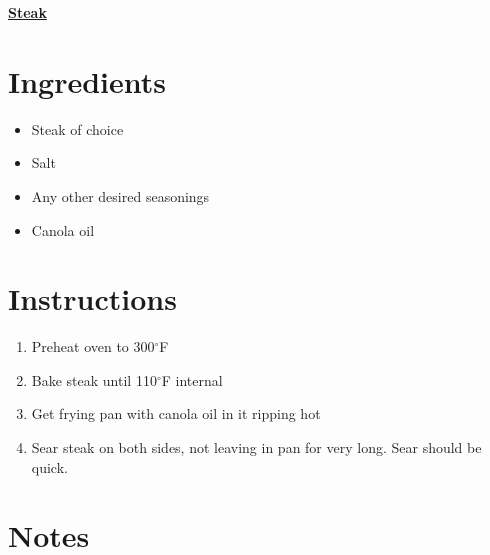 \documentclass[11pt]{article}
\begin{document}
	\begin{center}\begin{huge}\underline{\textbf{Steak}}\end{huge}\end{center}

	\section*{Ingredients}
	\begin{itemize}
		\item Steak of choice
		\item Salt
		\item Any other desired seasonings
		\item Canola oil
	\end{itemize}
	
	\section*{Instructions}
	\begin{enumerate}
		\item Preheat oven to 300$^\circ$F
		\item Bake steak until 110$^\circ$F internal
		\item Get frying pan with canola oil in it ripping hot
		\item Sear steak on both sides, not leaving in pan for very long. Sear should be quick.
	\end{enumerate}
	
	\section*{Notes}
	
\end{document}
